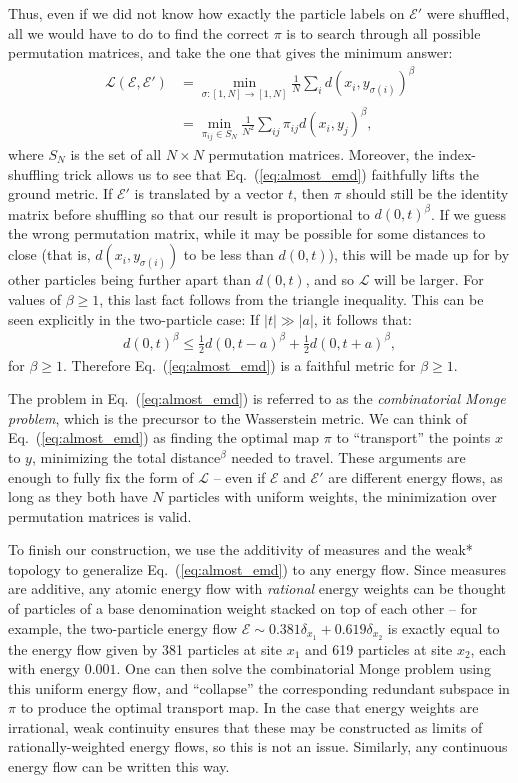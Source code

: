 \documentclass[letterpaper,11pt]{article}
\newcommand{\E}{\mathcal{E}}
\DeclareRobustCommand{\Eq}[1]{Eq.~(\ref{eq:#1})}
\begin{document}
Thus, even if we did not know how exactly the particle labels on $\E'$ were shuffled, all we would have to do to find the correct $\pi$ is to search through all possible permutation matrices, and take the one that gives the minimum answer:
%
\begin{align}
    \mathcal{L}(\E, \E') &= \min_{\sigma:[1,N]\to[1,N]}\frac{1}{N}\sum_{i}d(x_i, y_{\sigma(i)})^\beta \nonumber \\
    &= \min_{\pi_{ij} \in S_N} \frac{1}{N^2} \sum_{ij} \pi_{ij}d(x_i, y_j)^\beta, \label{eq:almost_emd}
\end{align}
%
where $S_N$ is the set of all $N\times N$ permutation matrices. Moreover, the index-shuffling trick allows us to see that \Eq{almost_emd} faithfully lifts the ground metric. If $\E'$ is translated by a vector $t$, then $\pi$ should still be the identity matrix before shuffling so that our result is proportional to $d(0,t)^\beta$. If we guess the wrong permutation matrix, while it may be possible for some distances to close (that is, $d(x_i, y_{\sigma(i)})$ to be less than $d(0,t)$), this will be made up for by other particles being further apart than $d(0,t)$, and so $\mathcal{L}$ will be larger.
%
For values of $\beta \geq 1$, this last fact follows from the triangle inequality. 
%
This can be seen explicitly in the two-particle case:   If $|t| \gg |a|$, it follows that:
 \begin{align}
     d(0,t)^\beta \leq \frac{1}{2}d(0,t-a)^\beta + \frac{1}{2}d(0,t+a)^\beta,
 \end{align}
%
for $\beta \geq 1$. Therefore \Eq{almost_emd} is a faithful metric for $\beta \geq 1$.


The problem in \Eq{almost_emd} is referred to as the \emph{combinatorial Monge problem}, which is the precursor to the Wasserstein metric. We can think of \Eq{almost_emd} as finding the optimal map $\pi$ to ``transport'' the points $x$ to $y$, minimizing the total distance$^\beta$ needed to travel. These arguments are enough to fully fix the form of $\mathcal{L}$ -- even if $\E$ and $\E'$ are different energy flows, as long as they both have $N$ particles with uniform weights, the minimization over permutation matrices is valid.

 To finish our construction, we  use the additivity of measures and the weak* topology to generalize \Eq{almost_emd} to any energy flow. Since measures are additive, any atomic energy flow with \emph{rational} energy weights can be thought of particles of a base denomination weight stacked on top of each other -- for example, the two-particle energy flow $\E \sim 0.381\delta_{x_1} + 0.619\delta_{x_2}$ is exactly equal to the energy flow given by 381 particles at site $x_1$ and 619 particles at site $x_2$, each with energy $0.001$. One can then solve the combinatorial Monge problem using this uniform energy flow, and ``collapse'' the corresponding redundant subspace in $\pi$ to produce the optimal transport map. In the case that energy weights are irrational, weak continuity  ensures that these may be constructed as limits of rationally-weighted energy flows, so this is not an issue. Similarly, any continuous energy flow can be written this way.
\end{document}
